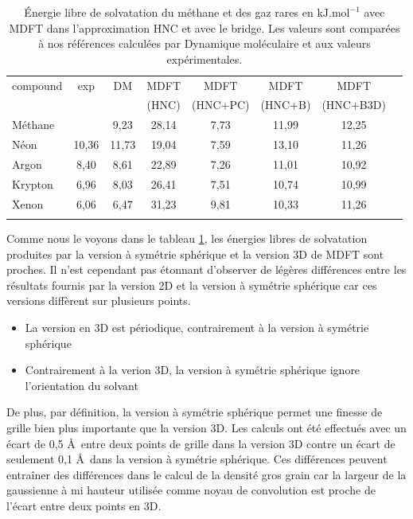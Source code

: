 \begin{table}[ht]
  \centering
  \begin{tabular}{l c c c c c c c}
    \hline & \\[-1em]\hline
    compound   & exp  & DM & MDFT & MDFT & MDFT  & MDFT \\
               &      &    & (HNC)  & (HNC+PC)  & (HNC+B) & (HNC+B3D) \\
    \hline
    Méthane    &       &  9,23 & 28,14 & 7,73 & 11,99 & 12,25 \\
    Néon       & 10,36 & 11,73 & 19,04 & 7,59 & 13,10 & 11,26 \\
    Argon      &  8,40 &  8,61 & 22,89 & 7,26 & 11,01 & 10,92 \\
    Krypton    &  6,96 &  8,03 & 26,41 & 7,51 & 10,74 & 10,99 \\
    Xenon      &  6,06 &  6,47 & 31,23 & 9,81 & 10,33 & 11,26 \\
    \hline & \\[-1em]\hline
  \end{tabular}
  \caption[\'Energie libre de solvatation du méthane et des gaz rares.]{\'Energie libre de solvatation du méthane et des gaz rares en $\mathrm{kJ}.\mathrm{mol}^{-1}$ avec MDFT dans l'approximation HNC et avec le bridge. Les valeurs sont comparées à nos références calculées par Dynamique moléculaire et aux valeurs expérimentales\cite{straatsma_free_1986}.}
  \label{tab:deltag_1D_3D}  
\end{table}

Comme nous le voyons dans le tableau \ref{tab:deltag_1D_3D}, les énergies libres de solvatation produites par la version à symétrie sphérique et la version 3D de MDFT sont proches. Il n'est cependant pas étonnant d'observer de légères différences entre les résultats fournis par la version 2D et la version à symétrie sphérique car ces versions diffèrent sur plusieurs points. 

\begin{itemize}
\item La version en 3D est périodique, contrairement à la version à symétrie sphérique
\item Contrairement à la verion 3D, la version à symétrie sphérique ignore l'orientation du solvant
\end{itemize}

De plus, par définition, la version à symétrie sphérique permet une finesse de grille bien plus importante que la version 3D. Les calculs ont été effectués avec un écart de 0,5 \AA\ entre deux points de grille dans la version 3D contre un écart de seulement 0,1 \AA\ dans la version à symétrie sphérique. Ces différences peuvent entraîner des différences dans le calcul de la densité gros grain car la largeur de la gaussienne à mi hauteur utilisée comme noyau de convolution est proche de l'écart entre deux points en 3D.

